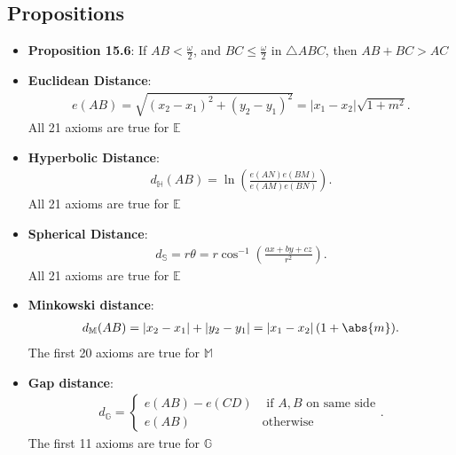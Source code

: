 \documentclass{report}
\begin{document}
    \pagebreak 
    \subsection{Propositions}
    \begin{itemize}
        \item \textbf{Proposition 15.6}: If $AB < \frac{\omega}{2}$, and $ BC \leq \frac{\omega}{2}$ in $ \triangle ABC$, then $AB + BC > AC$
    \end{itemize}

    \pagebreak 
    \begin{itemize}
        \item \textbf{Euclidean Distance}:
            \begin{align*}
                e(AB) = \sqrt{(x_{2} - x_{1})^{2} + (y_{2} - y_{1})^{2}} = \left\lvert x_{1} - x_{2} \right\rvert \sqrt{1+m^{2}}
            .\end{align*}
            \bigbreak \noindent 
            All 21 axioms are true for $\mathbb{E}$
        \item \textbf{Hyperbolic Distance}:
            \begin{align*}
                d_{\mathbb{H}}(AB) = \ln{\left(\frac{e(AN)e(BM)}{e(AM)e(BN)}\right)}
            .\end{align*}
            All 21 axioms are true for $\mathbb{E}$
        \item \textbf{Spherical Distance}:
            \begin{align*}
                d_{\mathbb{S}} = r\theta = r\cos^{-1}{\left(\frac{ax+by+cz}{r^{2}}\right)}
            .\end{align*}
            All 21 axioms are true for $\mathbb{E}$
        \item \textbf{Minkowski distance}:
            \begin{align*}
                d_{\mathbb{M}}(AB) = \left\lvert x_{2} - x_{1} \right\rvert + \left\lvert y_{2} - y_{1} \right\rvert = \left\lvert x_{1} - x_{2} \right\rvert (1+\abs{m})
            .\end{align*}
            The first 20 axioms are true for $\mathbb{M}$
        \item \textbf{Gap distance}:
            \begin{align*}
                d_{\mathbb{G}} = \begin{cases}
                    e(AB) - e(CD) & \text{ if $A,B$ on same side} \\
                    e(AB) & \text{otherwise}
                \end{cases}
            .\end{align*}
            The first 11 axioms are true for $\mathbb{G}$
    \end{itemize}
\end{document}

